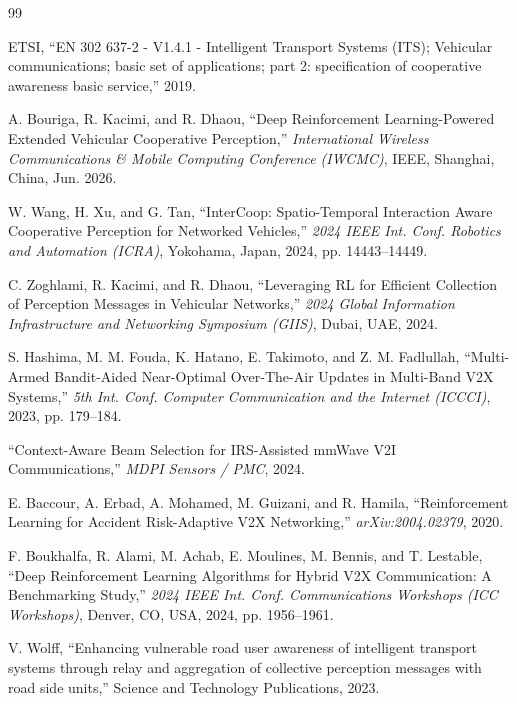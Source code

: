 \documentclass[12pt,a4paper]{article}
\begin{document}

\begin{thebibliography}{99}

ETSI, ``EN 302 637-2 - V1.4.1 - Intelligent Transport Systems (ITS); Vehicular
communications; basic set of applications; part 2: specification of cooperative
awareness basic service,'' 2019.

A. Bouriga, R. Kacimi, and R. Dhaou, ``Deep Reinforcement Learning-Powered Extended
Vehicular Cooperative Perception,'' \textit{International Wireless Communications
\& Mobile Computing Conference (IWCMC)}, IEEE, Shanghai, China, Jun. 2026.

W. Wang, H. Xu, and G. Tan, ``InterCoop: Spatio-Temporal Interaction Aware Cooperative
Perception for Networked Vehicles,'' \textit{2024 IEEE Int. Conf. Robotics and
Automation (ICRA)}, Yokohama, Japan, 2024, pp. 14443--14449.

C. Zoghlami, R. Kacimi, and R. Dhaou, ``Leveraging RL for Efficient Collection of
Perception Messages in Vehicular Networks,'' \textit{2024 Global Information
Infrastructure and Networking Symposium (GIIS)}, Dubai, UAE, 2024.

S. Hashima, M. M. Fouda, K. Hatano, E. Takimoto, and Z. M. Fadlullah,
``Multi-Armed Bandit-Aided Near-Optimal Over-The-Air Updates in Multi-Band V2X
Systems,'' \textit{5th Int. Conf. Computer Communication and the Internet (ICCCI)},
2023, pp. 179--184.

``Context-Aware Beam Selection for IRS-Assisted mmWave V2I Communications,''
\textit{MDPI Sensors / PMC}, 2024.

E. Baccour, A. Erbad, A. Mohamed, M. Guizani, and R. Hamila,
``Reinforcement Learning for Accident Risk-Adaptive V2X Networking,''
\textit{arXiv:2004.02379}, 2020.

F. Boukhalfa, R. Alami, M. Achab, E. Moulines, M. Bennis, and T. Lestable,
``Deep Reinforcement Learning Algorithms for Hybrid V2X Communication: A Benchmarking
Study,'' \textit{2024 IEEE Int. Conf. Communications Workshops (ICC Workshops)},
Denver, CO, USA, 2024, pp. 1956--1961.

V. Wolff, ``Enhancing vulnerable road user awareness of intelligent transport systems
through relay and aggregation of collective perception messages with road side units,''
Science and Technology Publications, 2023.


\end{thebibliography}
\end{document}
